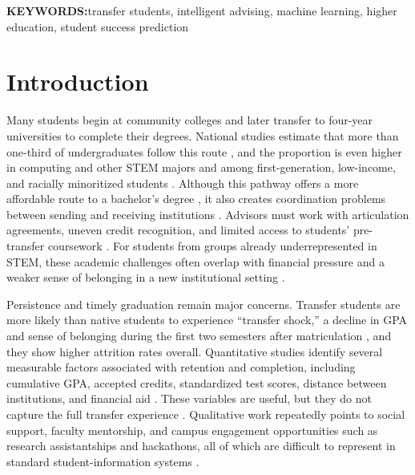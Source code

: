 \documentclass[letterpaper,11pt]{article}
\begin{document}
\bigskip

\noindent\textbf{KEYWORDS:}\quad transfer students, intelligent advising, machine learning, higher education, student success prediction

\section{Introduction}\label{sec:introduction}

Many students begin at community colleges and later transfer to four-year universities to complete their degrees. National studies estimate that more than one-third of undergraduates follow this route \parencite{monaghan2015}, and the proportion is even higher in computing and other STEM majors and among first-generation, low-income, and racially minoritized students \parencite{computingtransfer2024,wali2025transfer}. Although this pathway offers a more affordable route to a bachelor's degree \parencite{factoranalysis2023}, it also creates coordination problems between sending and receiving institutions \parencite{nguyen2025school}. Advisors must work with articulation agreements, uneven credit recognition, and limited access to students' pre-transfer coursework \parencite{nguyen2024community,roksa2008credits}. For students from groups already underrepresented in STEM, these academic challenges often overlap with financial pressure and a weaker sense of belonging in a new institutional setting \parencite{computingtransfer2024,nguyen2025school}.

Persistence and timely graduation remain major concerns. Transfer students are more likely than native students to experience ``transfer shock,'' a decline in GPA and sense of belonging during the first two semesters after matriculation \parencite{jaggars2025}, and they show higher attrition rates overall. Quantitative studies identify several measurable factors associated with retention and completion, including cumulative GPA, accepted credits, standardized test scores, distance between institutions, and financial aid \parencite{jaggars2025,roksa2008credits,factoranalysis2023}. These variables are useful, but they do not capture the full transfer experience \parencite{nguyen2025school}. Qualitative work repeatedly points to social support, faculty mentorship, and campus engagement opportunities such as research assistantships and hackathons, all of which are difficult to represent in standard student-information systems \parencite{thiry2023}.
\end{document}

